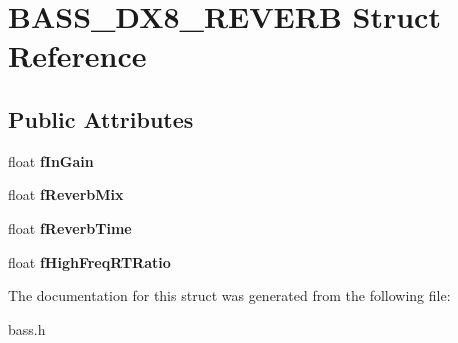\section{B\+A\+S\+S\+\_\+\+D\+X8\+\_\+\+R\+E\+V\+E\+R\+B Struct Reference}
\label{struct_b_a_s_s___d_x8___r_e_v_e_r_b}
\subsection*{Public Attributes}
\begin{DoxyCompactItemize}
\item 
float {\bfseries f\+In\+Gain}\label{struct_b_a_s_s___d_x8___r_e_v_e_r_b_a3e6c02bdd61a3fae050c6a7f9318edd6}

\item 
float {\bfseries f\+Reverb\+Mix}\label{struct_b_a_s_s___d_x8___r_e_v_e_r_b_aaf55c48b1628fde8c6834fa5a223d807}

\item 
float {\bfseries f\+Reverb\+Time}\label{struct_b_a_s_s___d_x8___r_e_v_e_r_b_adb97abb30a9a52c71e7a01d0b1c9b597}

\item 
float {\bfseries f\+High\+Freq\+R\+T\+Ratio}\label{struct_b_a_s_s___d_x8___r_e_v_e_r_b_ac19b8eddbad1b31e88ac508ccaa08a2d}

\end{DoxyCompactItemize}


The documentation for this struct was generated from the following file\+:\begin{DoxyCompactItemize}
\item 
bass.\+h\end{DoxyCompactItemize}
